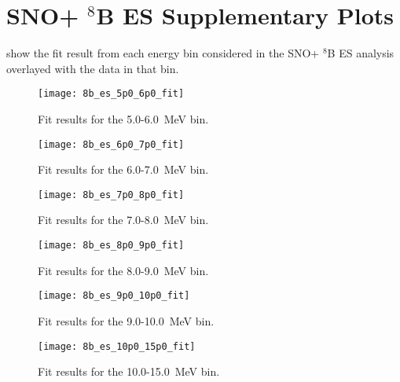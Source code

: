 \chapter{SNO+ $^8$B ES Supplementary Plots}
\label{chap:solar_bins}

 show the fit result from each energy bin considered in the SNO+ $^8$B ES analysis overlayed with the data in that bin.

\begin{figure}
\centering
\texttt{[image: 8b\_es\_5p0\_6p0\_fit]}
\caption{\label{fig:56}Fit results for the 5.0-6.0~MeV bin.}
\end{figure}

\begin{figure}
\centering
\texttt{[image: 8b\_es\_6p0\_7p0\_fit]}
\caption{\label{fig:67}Fit results for the 6.0-7.0~MeV bin.}
\end{figure}

\begin{figure}
\centering
\texttt{[image: 8b\_es\_7p0\_8p0\_fit]}
\caption{\label{fig:78}Fit results for the 7.0-8.0~MeV bin.}
\end{figure}

\begin{figure}
\centering
\texttt{[image: 8b\_es\_8p0\_9p0\_fit]}
\caption{\label{fig:89}Fit results for the 8.0-9.0~MeV bin.}
\end{figure}

\begin{figure}
\centering
\texttt{[image: 8b\_es\_9p0\_10p0\_fit]}
\caption{\label{fig:910}Fit results for the 9.0-10.0~MeV bin.}
\end{figure}

\begin{figure}
\centering
\texttt{[image: 8b\_es\_10p0\_15p0\_fit]}
\caption{\label{fig:1015}Fit results for the 10.0-15.0~MeV bin.}
\end{figure}


\clearpage

